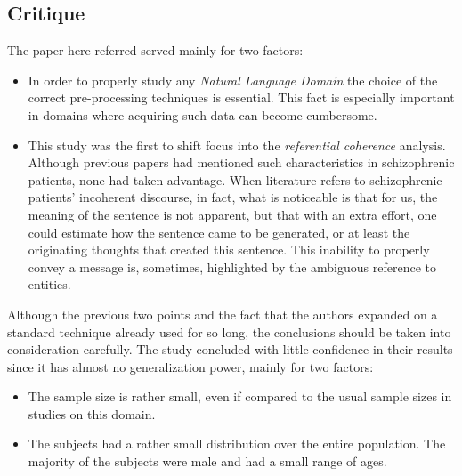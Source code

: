 \documentclass{Paper_Summary}
\begin{document}
\makepapertitle

\breakline

\begin{center}
    \section*{Critique}
\end{center}

    The paper here referred served mainly for two factors:
    \begin{itemize}
        \item In order to properly study any \emph{Natural Language Domain} the choice of the correct pre-processing techniques is essential. This fact is especially important in domains where acquiring such data can become cumbersome.
        \item This study was the first to shift focus into the \emph{referential coherence} analysis. Although previous papers had mentioned such characteristics in schizophrenic patients, none had taken advantage. When literature refers to schizophrenic patients' incoherent discourse, in fact, what is noticeable is that for us, the meaning of the sentence is not apparent, but that with an extra effort, one could estimate how the sentence came to be generated, or at least the originating thoughts that created this sentence. This inability to properly convey a message is, sometimes, highlighted by the ambiguous reference to entities.
    \end{itemize}

    Although the previous two points and the fact that the authors expanded on a standard technique already used for so long, the conclusions should be taken into consideration carefully. The study concluded with little confidence in their results since it has almost no generalization power, mainly for two factors:
    \begin{itemize}
        \item The sample size is rather small, even if compared to the usual sample sizes in studies on this domain.
        \item The subjects had a rather small distribution over the entire population. The majority of the subjects were male and had a small range of ages.
    \end{itemize}

\breakline
\end{document}
